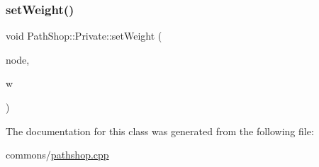 \mbox{\label{class_path_shop_1_1_private_ab2e532d00fb1780550035e81aeecb9d4}} 
\subsubsection{\texorpdfstring{setWeight()}{setWeight()}}
{\footnotesize\ttfamily void Path\+Shop\+::\+Private\+::set\+Weight (\begin{DoxyParamCaption}\item[{\mbox{\hyperlink{classtypes_1_1_node_id}{types\+::\+Node\+Id}}}]{node,  }\item[{weight\+\_\+t}]{w }\end{DoxyParamCaption})\hspace{0.3cm}{\ttfamily [inline]}}



The documentation for this class was generated from the following file\+:\begin{DoxyCompactItemize}
\item 
commons/\mbox{\hyperlink{pathshop_8cpp}{pathshop.\+cpp}}\end{DoxyCompactItemize}
